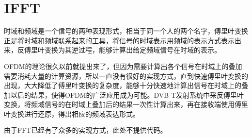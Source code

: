 	\section{IFFT}
		\par 时域和频域是一个信号的两种表现形式，相当于同一个人的两个名字，傅里叶变换正是将时域和频域联系起来的工具，将信号的时域表示用频域的表示方式表示出来，反傅里叶变换为其逆过程，能够计算出给定频域信号在时域的表示。
		\par OFDM的理论很久以前就提出来了，但因为需要计算出各个信号在时域上的叠加需要消耗大量的计算资源，所以一直没有很好的实现方式，直到快速傅里叶变换的出现，大大降低了傅里叶变换的复杂度，能够十分快速地计算出信号在时域上的叠加以后的结果，使得OFDM的广泛应用成为可能。DVB-T发射系统中采反傅里叶变换，将频域信号的在时域上叠加后的结果一次性计算出来，再在接收端使用傅里叶变换进行还原，得出相应的频域表达形式。
		\par 由于FFT已经有了众多的实现方式，此处不提供代码。
